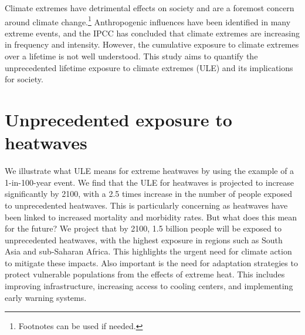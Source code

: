 \documentclass[9pt, twoside, twocolumn]{extarticle}
\begin{document}
\titleblock

Climate extremes have detrimental effects on society and are a foremost concern around climate change.\footnote{Footnotes can be used if needed.} Anthropogenic influences have been identified in many extreme events, and the IPCC has concluded that climate extremes are increasing in frequency and intensity.\cite{IPCC2021} However, the cumulative exposure to climate extremes over a lifetime is not well understood. This study aims to quantify the unprecedented lifetime exposure to climate extremes (ULE) and its implications for society.


\section*{Unprecedented exposure to heatwaves}
We illustrate what ULE means for extreme heatwaves by using the example of a 1-in-100-year event. We find that the ULE for heatwaves is projected to increase significantly by 2100, with a 2.5 times increase in the number of people exposed to unprecedented heatwaves.\cite{Grant2025} This is particularly concerning as heatwaves have been linked to increased mortality and morbidity rates. But what does this mean for the future? We project that by 2100, 1.5 billion people will be exposed to unprecedented heatwaves, with the highest exposure in regions such as South Asia and sub-Saharan Africa.\cite{Grant2025} This highlights the urgent need for climate action to mitigate these impacts. Also important is the need for adaptation strategies to protect vulnerable populations from the effects of extreme heat. This includes improving infrastructure, increasing access to cooling centers, and implementing early warning systems.\cite{IPCC2021}
\end{document}
